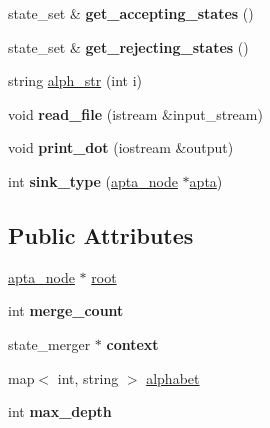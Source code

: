 \begin{DoxyCompactItemize}
\item 
state\+\_\+set \& {\bfseries get\+\_\+accepting\+\_\+states} ()\hypertarget{classapta_a5f7d0df90526333f1fd33d439783deb6}{}\label{classapta_a5f7d0df90526333f1fd33d439783deb6}

\item 
state\+\_\+set \& {\bfseries get\+\_\+rejecting\+\_\+states} ()\hypertarget{classapta_aa43981db18b260315f685a1eb57ac00d}{}\label{classapta_aa43981db18b260315f685a1eb57ac00d}

\item 
string \hyperlink{classapta_a244ffcaf3ff27062eec5463d26033ac8}{alph\+\_\+str} (int i)
\item 
void {\bfseries read\+\_\+file} (istream \&input\+\_\+stream)\hypertarget{classapta_aba445f4073c6358d699f523f6f8890b3}{}\label{classapta_aba445f4073c6358d699f523f6f8890b3}

\item 
void {\bfseries print\+\_\+dot} (iostream \&output)\hypertarget{classapta_ac882456f8a38ed04e27763f25580975f}{}\label{classapta_ac882456f8a38ed04e27763f25580975f}

\item 
int {\bfseries sink\+\_\+type} (\hyperlink{classapta__node}{apta\+\_\+node} $\ast$\hyperlink{classapta}{apta})\hypertarget{classapta_a81486fd0903cbc20ada8a3e326266de5}{}\label{classapta_a81486fd0903cbc20ada8a3e326266de5}

\end{DoxyCompactItemize}
\subsection*{Public Attributes}
\begin{DoxyCompactItemize}
\item 
\hyperlink{classapta__node}{apta\+\_\+node} $\ast$ \hyperlink{classapta_a949591494b3e64716c9f200cc27e5828}{root}
\item 
int {\bfseries merge\+\_\+count}\hypertarget{classapta_a01190956e1295981ba35e993d3d83941}{}\label{classapta_a01190956e1295981ba35e993d3d83941}

\item 
state\+\_\+merger $\ast$ {\bfseries context}\hypertarget{classapta_aaa5552733c7e2b234a6aa048692a4a42}{}\label{classapta_aaa5552733c7e2b234a6aa048692a4a42}

\item 
map$<$ int, string $>$ \hyperlink{classapta_aa00686610bad90c62391501a9d2bb469}{alphabet}
\item 
int {\bfseries max\+\_\+depth}\hypertarget{classapta_a68c2d115bd743fd4bafd415885225c47}{}\label{classapta_a68c2d115bd743fd4bafd415885225c47}

\end{DoxyCompactItemize}


